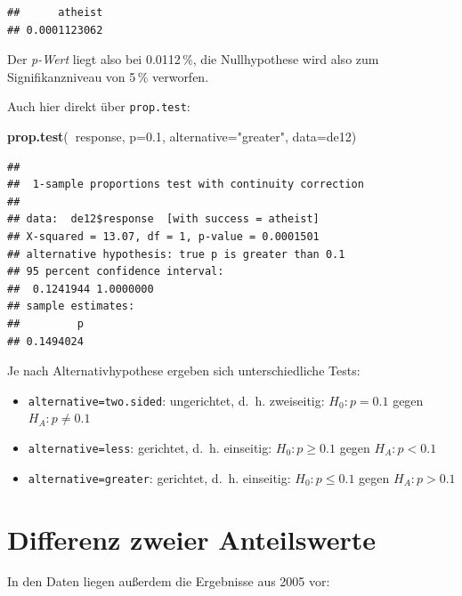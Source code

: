 \documentclass[12pt,ngerman,paper=a4,pagesize,DIV=13]{scrreprt}
\newenvironment{Shaded}{\begin{snugshade}}{\end{snugshade}}
\newcommand{\DataTypeTok}[1]{\textcolor[rgb]{0.13,0.29,0.53}{#1}}
\newcommand{\FloatTok}[1]{\textcolor[rgb]{0.00,0.00,0.81}{#1}}
\newcommand{\KeywordTok}[1]{\textcolor[rgb]{0.13,0.29,0.53}{\textbf{#1}}}
\newcommand{\NormalTok}[1]{#1}
\newcommand{\OperatorTok}[1]{\textcolor[rgb]{0.81,0.36,0.00}{\textbf{#1}}}
\newcommand{\StringTok}[1]{\textcolor[rgb]{0.31,0.60,0.02}{#1}}
\providecommand{\tightlist}{%
  \setlength{\itemsep}{0pt}\setlength{\parskip}{0pt}}
\begin{document}
\begin{verbatim}
##      atheist 
## 0.0001123062
\end{verbatim}

Der \emph{p-Wert} liegt also bei 0.0112\(\,\)\%, die Nullhypothese wird
also zum Signifikanzniveau von 5\(\,\)\% verworfen.

Auch hier direkt über \texttt{prop.test}:

\begin{Shaded}
\begin{Highlighting}[]
\KeywordTok{prop.test}\NormalTok{(}\OperatorTok{~}\NormalTok{response, }\DataTypeTok{p=}\FloatTok{0.1}\NormalTok{, }\DataTypeTok{alternative=}\StringTok{"greater"}\NormalTok{, }\DataTypeTok{data=}\NormalTok{de12)}
\end{Highlighting}
\end{Shaded}

\begin{verbatim}
## 
##  1-sample proportions test with continuity correction
## 
## data:  de12$response  [with success = atheist]
## X-squared = 13.07, df = 1, p-value = 0.0001501
## alternative hypothesis: true p is greater than 0.1
## 95 percent confidence interval:
##  0.1241944 1.0000000
## sample estimates:
##         p 
## 0.1494024
\end{verbatim}

Je nach Alternativhypothese ergeben sich unterschiedliche Tests:

\begin{itemize}
\tightlist
\item
  \texttt{alternative=\textquotesingle{}two.sided\textquotesingle{}}:
  ungerichtet, d.~h. zweiseitig: \(H_0: p=0.1\) gegen \(H_A: p\neq0.1\)
\item
  \texttt{alternative=\textquotesingle{}less\textquotesingle{}}:
  gerichtet, d.~h. einseitig: \(H_0: p\geq 0.1\) gegen \(H_A: p<0.1\)
\item
  \texttt{alternative=\textquotesingle{}greater\textquotesingle{}}:
  gerichtet, d.~h. einseitig: \(H_0: p\leq 0.1\) gegen \(H_A: p>0.1\)
\end{itemize}

\hypertarget{differenz-zweier-anteilswerte}{%
\section{Differenz zweier
Anteilswerte}\label{differenz-zweier-anteilswerte}}

In den Daten liegen außerdem die Ergebnisse aus 2005 vor:
\end{document}
